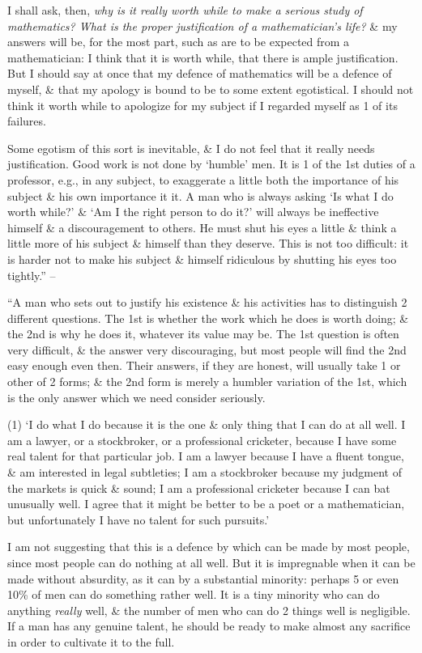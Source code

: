 \documentclass{article}
\numberwithin{equation}{section}
\begin{document}
I shall ask, then, \textit{why is it really worth while to make a serious study of mathematics? What is the proper justification of a mathematician's life?} \& my answers will be, for the most part, such as are to be expected from a mathematician: I think that it is worth while, that there is ample justification. But I should say at once that my defence of mathematics will be a defence of myself, \& that my apology is bound to be to some extent egotistical.  I should not think it worth while to apologize for my subject if I regarded myself as 1 of its failures.

Some egotism of this sort is inevitable, \& I do not feel that it really needs justification. Good work is not done by `humble' men. It is 1 of the 1st duties of a professor, e.g., in any subject, to exaggerate a little both the importance of his subject \& his own importance it it. A man who is always asking `Is what I do worth while?' \& `Am I the right person to do it?' will always be ineffective himself \& a discouragement to others. He must shut his eyes a little \& think a little more of his subject \& himself than they deserve. This is not too difficult: it is harder not to make his subject \& himself ridiculous by shutting his eyes too tightly.'' -- \cite[pp. 63--66]{Hardy1992}

 ``A man who sets out to justify his existence \& his activities has to distinguish 2 different questions. The 1st is whether the work which he does is worth doing; \& the 2nd is why he does it, whatever its value may be. The 1st question is often very difficult, \& the answer very discouraging, but most people will find the 2nd easy enough even then. Their answers, if they are honest, will usually take 1 or other of 2 forms; \& the 2nd form is merely a humbler variation of the 1st, which is the only answer which we need consider seriously.

(1) `I do what I do because it is the one \& only thing that I can do at all well. I am a lawyer, or a stockbroker, or a professional cricketer, because I have some real talent for that particular job. I am a lawyer because I have a fluent tongue, \& am interested in legal subtleties; I am a stockbroker because my judgment of the markets is quick \& sound; I am a professional cricketer because I can bat unusually well. I agree that it might be better to be a poet or a mathematician, but unfortunately I have no talent for such pursuits.'

I am not suggesting that this is a defence by which can be made by most people, since most people can do nothing at all well. But it is impregnable when it can be made without absurdity, as it can by a substantial minority: perhaps 5 or even 10\% of men can do something rather well. It is a tiny minority who can do anything \textit{really} well, \& the number of men who can do 2 things well is negligible. If a man has any genuine talent, he should be ready to make almost any sacrifice in order to cultivate it to the full.
\end{document}
